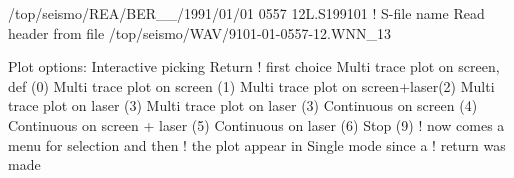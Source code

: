 \begin{boxedverbatim}
/top/seismo/REA/BER__/1991/01/01 0557 12L.S199101 ! S-file name
Read header from file /top/seismo/WAV/9101-01-0557-12.WNN_13

 Plot options:     Interactive picking          Return  ! first choice
                   Multi trace plot on screen, def (0) 
                   Multi trace plot on screen      (1) 
                   Multi trace plot on screen+laser(2) 
                   Multi trace plot on laser       (3) 
                   Multi trace plot on laser       (3) 
                   Continuous on screen            (4)
                   Continuous on screen + laser    (5)
                   Continuous on laser             (6)
                   Stop                            (9)
                       ! now comes a menu for selection and then
                       ! the plot appear in Single mode since a 
                       ! return was made
\end{boxedverbatim}
